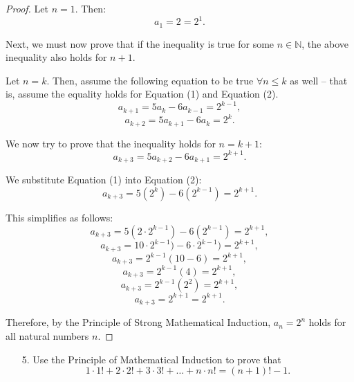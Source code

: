 \documentclass[10pt]{article}
\theoremstyle{definition}
\theoremstyle{plain}
\newcommand{\N}{\mathbb{N}}
\begin{document}
\setcounter{equation}{0}
\begin{proof}
  Let $n=1$. Then:
  $$a_1 = 2 = 2^1.$$

  \par Next, we must now prove that if the inequality is true for some $n\in\N$, the above inequality also holds for $n+1$.

  \par Let $n=k$. Then, assume the following equation to be true $\forall n \leq k$ as well -- that is, assume the equality holds for Equation (1) and Equation (2).
  \begin{equation}
    a_{k+1} = 5a_{k} - 6a_{k-1} = 2^{k-1},
  \end{equation}
  \begin{equation}
    a_{k+2} = 5a_{k+1} - 6a_{k} = 2^{k}.
  \end{equation}

  \par We now try to prove that the inequality holds for $n=k+1$:
  \begin{equation}
    a_{k+3} = 5a_{k+2} - 6a_{k+1} = 2^{k+1}.
  \end{equation}

  \par We substitute Equation (1) into Equation (2):
  \begin{equation}
    a_{k+3} = 5(2^k) - 6(2^{k-1}) = 2^{k+1}.
  \end{equation}

  \par This simplifies as follows:
    $$a_{k+3} = 5(2\cdot2^{k-1}) - 6(2^{k-1}) = 2^{k+1},$$
    $$a_{k+3} = 10\cdot2^{k-1}) - 6\cdot2^{k-1}) = 2^{k+1},$$
    $$a_{k+3} = 2^{k-1}(10 - 6) = 2^{k+1},$$
    $$a_{k+3} = 2^{k-1}(4) = 2^{k+1},$$
    $$a_{k+3} = 2^{k-1}(2^2) = 2^{k+1},$$
  \begin{equation}
    a_{k+3} = 2^{k+1} = 2^{k+1}.
  \end{equation}

  \par Therefore, by the Principle of Strong Mathematical Induction, $a_n = 2^n$ holds for all natural numbers $n$.
\end{proof}



\pagebreak



\begin{enumerate}
  \item[5.] Use the Principle of Mathematical Induction to prove that
  $$1 \cdot 1! + 2 \cdot 2! + 3 \cdot 3! + \dots + n \cdot n! = (n+1)! - 1.$$
\end{enumerate}
\end{document}
